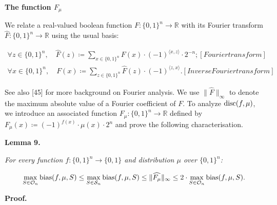 \par\medskip\noindent\textbf{The function $F_{\mu}$
}\par




We relate a real-valued boolean function $F\colon\{0,1\}^{n}\to\mathbb{R}$ with its Fourier transform $\widehat{F}:\{0,1\}^{n}\to\mathbb{R}$ using the usual basis:\par


\[\begin{gathered}
\displaystyle\forall z\in\{0,1\}^{n},\quad\widehat{F}(z) \displaystyle\coloneqq\sum\nolimits_{x\in\{0,1\}^{n}}F(x)\cdot(-1)^{\langle x,z\rangle}\cdot 2^{-n}; [Fourier transform] \\
\displaystyle\forall x\in\{0,1\}^{n},\quad F(x) \displaystyle\coloneqq\sum\nolimits_{z\in\{0,1\}^{n}}\widehat{F}(z)\cdot(-1)^{\langle z,x\rangle}. [Inverse Fourier transform]
\end{gathered}\]


See also [45] for more background on Fourier analysis. We use $\|\widehat{F}\|_{\infty}$ to denote the maximum absolute value of a Fourier coefficient of $F$. To analyze ${\textup{disc}}(f,\mu)$, we introduce an associated function $F_{\mu}\colon\{0,1\}^{n}\to\mathbb{R}$ defined by $F_{\mu}(x)\coloneqq(-1)^{f(x)}\cdot\mu(x)\cdot 2^{n}$ and prove the following characterisation.\par





\par\medskip\noindent\textbf{
\textbf{Lemma 9}\textbf{.}
}\par



\emph{For every function $f\colon\{0,1\}^{n}\to\{0,1\}$ and distribution $\mu$ over $\{0,1\}^{n}$:}\par


\[\begin{gathered}
\max_{S\in\mathcal{O}_{n}}{\textup{bias}}(f,\mu,S)\leq\max_{S\in\mathcal{S}_{n}}{\textup{bias}}(f,\mu,S)\leq\|\widehat{F_{\mu}}\|_{\infty}\leq 2\cdot\max_{S\in\mathcal{O}_{n}}{\textup{bias}}(f,\mu,S).
\end{gathered}\]






\par\medskip\noindent\textbf{Proof.}\par





